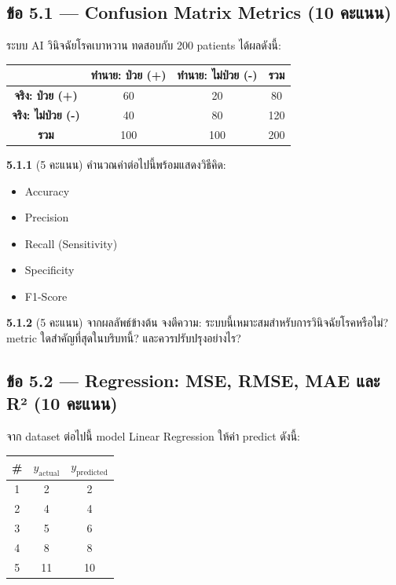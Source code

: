 \documentclass[a4paper,12pt]{article}
\begin{document}
\vspace{0.3cm}
\subsection*{ข้อ 5.1 — Confusion Matrix Metrics (10 คะแนน)}

ระบบ AI วินิจฉัยโรคเบาหวาน ทดสอบกับ 200 patients ได้ผลดังนี้:

\begin{center}
\renewcommand{\arraystretch}{1.4}
\begin{tabular}{c|cc|c}
    \hline
    \rowcolor{cyan!15}
    & \textbf{ทำนาย: ป่วย (+)} & \textbf{ทำนาย: ไม่ป่วย (-)} & \textbf{รวม} \\
    \hline
    \textbf{จริง: ป่วย (+)} & 60 & 20 & 80 \\
    \textbf{จริง: ไม่ป่วย (-)} & 40 & 80 & 120 \\
    \hline
    \textbf{รวม} & 100 & 100 & 200 \\
    \hline
\end{tabular}
\end{center}

\textbf{5.1.1} (5 คะแนน) คำนวณค่าต่อไปนี้พร้อมแสดงวิธีคิด:
\begin{itemize}
    \item Accuracy
    \item Precision
    \item Recall (Sensitivity)
    \item Specificity
    \item F1-Score
\end{itemize}
\vspace{6cm}

\textbf{5.1.2} (5 คะแนน) จากผลลัพธ์ข้างต้น จงตีความ: ระบบนี้เหมาะสมสำหรับการวินิจฉัยโรคหรือไม่? metric ใดสำคัญที่สุดในบริบทนี้? และควรปรับปรุงอย่างไร?
\vspace{3.5cm}

\newpage

\subsection*{ข้อ 5.2 — Regression: MSE, RMSE, MAE และ R² (10 คะแนน)}

จาก dataset ต่อไปนี้ model Linear Regression ให้ค่า predict ดังนี้:

\begin{center}
\renewcommand{\arraystretch}{1.3}
\begin{tabular}{|c|c|c|}
    \hline
    \rowcolor{cyan!15}
    \textbf{\#} & $y_{\text{actual}}$ & $y_{\text{predicted}}$ \\
    \hline
    1 & 2  & 2  \\
    2 & 4  & 4  \\
    3 & 5  & 6  \\
    4 & 8  & 8  \\
    5 & 11 & 10 \\
    \hline
\end{tabular}
\end{center}
\end{document}
